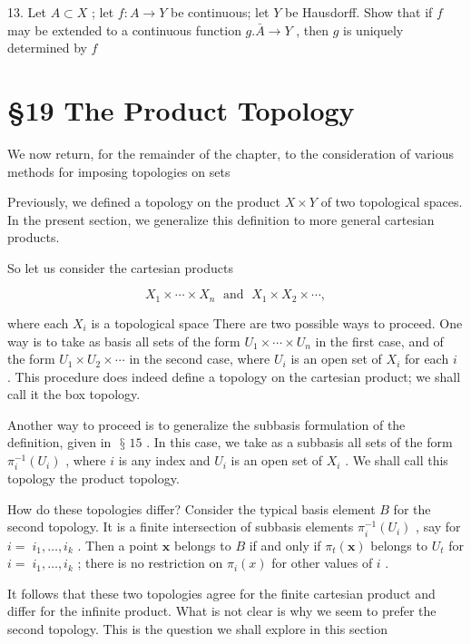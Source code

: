 \documentclass[10pt]{article}
\begin{document}
13. Let \(A \subset  X\) ; let \(f : A \rightarrow  Y\) be continuous; let \(Y\) be Hausdorff. Show that if \(f\) may be extended to a continuous function \(g.\bar{A} \rightarrow  Y\) , then \(g\) is uniquely determined by \(f\)

\section*{§19 The Product Topology}

We now return, for the remainder of the chapter, to the consideration of various methods for imposing topologies on sets

Previously, we defined a topology on the product \(X \times  Y\) of two topological spaces. In the present section, we generalize this definition to more general cartesian products.

So let us consider the cartesian products

\[
{X}_{1} \times  \cdots  \times  {X}_{n}\;\text{ and }\;{X}_{1} \times  {X}_{2} \times  \cdots ,
\]

where each \({X}_{i}\) is a topological space There are two possible ways to proceed. One way is to take as basis all sets of the form \({U}_{1} \times  \cdots  \times  {U}_{n}\) in the first case, and of the form \({U}_{1} \times  {U}_{2} \times  \cdots\) in the second case, where \({U}_{i}\) is an open set of \({X}_{i}\) for each \(i\) . This procedure does indeed define a topology on the cartesian product; we shall call it the box topology.

Another way to proceed is to generalize the subbasis formulation of the definition, given in \(\text{ § }{15}\) . In this case, we take as a subbasis all sets of the form \({\pi }_{i}^{-1}\left( {U}_{i}\right)\) , where \(i\) is any index and \({U}_{i}\) is an open set of \({X}_{i}\) . We shall call this topology the product topology.

How do these topologies differ? Consider the typical basis element \(B\) for the second topology. It is a finite intersection of subbasis elements \({\pi }_{i}^{-1}\left( {U}_{i}\right)\) , say for \(i = \; {i}_{1},\ldots ,{i}_{k}\) . Then a point \(\mathbf{x}\) belongs to \(B\) if and only if \({\pi }_{t}\left( \mathbf{x}\right)\) belongs to \({U}_{t}\) for \(i = \; {i}_{1},\ldots ,{i}_{k}\) ; there is no restriction on \({\pi }_{i}\left( x\right)\) for other values of \(i\) .

It follows that these two topologies agree for the finite cartesian product and differ for the infinite product. What is not clear is why we seem to prefer the second topology. This is the question we shall explore in this section
\end{document}
